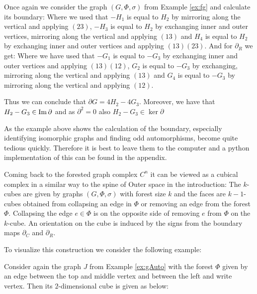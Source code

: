 \begin{eg}
	Once again we consider the graph $(G,\Phi,\sigma)$ from Example \ref{ex:fg} and calculate its boundary:
	Where we used that $-H_{1}$ is equal to $H_{2}$ by mirroring along the vertical and applying $(2 3)$,
	$-H_{3}$ is equal to $H_2$ by exchanging inner and outer vertices, mirroring along the vertical and applying $(1 3)$ and
	$H_{4}$ is equal to $H_{2}$ by exchanging inner and outer vertices and applying $(1 3)(2 3)$.
	And for $\partial_R$ we get:
	Where we have used that $-G_{1}$ is equal to $-G_{3}$ by exchanging inner and outer vertices and applying $(1 3)(1 2)$,
	$G_{2}$ is equal to $-G_{3}$ by exchanging, mirroring along the vertical and applying $(1 3)$ and
	$G_{4}$ is equal to $-G_{3}$ by mirroring along the vertical and applying $(1 2)$. 

	Thus we can conclude that $\partial G = 4 H_2 - 4 G_3$. Moreover, we have that $H_2 - G_3 \in \operatorname{Im} \partial$ and 
	as $\partial^2=0$ also $H_2 - G_3 \in \ker \partial$
\end{eg}

\begin{remark}
As the example above shows the calculation of the boundary, especially identifying isomorphic graphs and finding odd automorphisms, 
become quite tedious quickly. Therefore it is best to leave them to the computer and a python implementation
of this can be found in the appendix.
\end{remark}

Coming back to the forested graph complex $C^{n}$ it can be viewed as a cubical complex in a similar way to the spine of Outer space in the introduction:
The $k$-cubes are given by graphs $(G,\Phi,\sigma)$
with forest size $k$ and the faces are $k-1$-cubes obtained from collapsing an edge in $\Phi$ 
or removing an edge from the forest $\Phi$. Collapsing the edge $e \in \Phi$ is
on the opposite side of removing $e$ from $\Phi$ on the $k$-cube.
An orientation on the cube is induced by the signs from the boundary maps $\partial_{C}$ and $\partial_{R}$.

To visualize this construction we consider the following example:
\begin{eg}
	Consider again the graph $J$ from Example \ref{ex:gAuto} with the forest $\Phi$ given by an edge between the top and middle vertex and
	between the left and write vertex.
	Then its $2$-dimensional cube is given as below:
\end{eg}
\newpage
